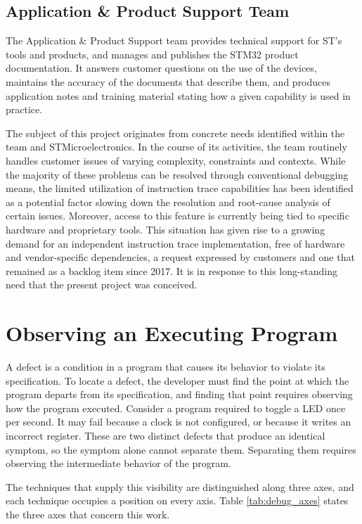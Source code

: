 \subsection{Application \& Product Support Team}

The Application \& Product Support team provides technical support for ST's tools and products, and manages and publishes the STM32 product documentation. It answers customer questions on the use of the devices, maintains the accuracy of the documents that describe them, and produces application notes and training material stating how a given capability is used in practice.

The subject of this project originates from concrete needs identified within the team and STMicroelectronics. In the course of its activities, the team routinely handles customer issues of varying complexity, constraints and contexts. While the majority of these problems can be resolved through conventional debugging means, the limited utilization of instruction trace capabilities has been identified as a potential factor slowing down the resolution and root-cause analysis of certain issues. Moreover, access to this feature is currently being tied to specific hardware and proprietary tools. This situation has given rise to a growing demand for an independent instruction trace implementation, free of hardware and vendor-specific dependencies, a request expressed by customers and one that remained as a backlog item since 2017. It is in response to this long-standing need that the present project was conceived.

\section{Observing an Executing Program}
\label{sec:observability}

A defect is a condition in a program that causes its behavior to violate its specification. To locate a defect, the developer must find the point at which the program departs from its specification, and finding that point requires observing how the program executed. Consider a program required to toggle a LED once per second. It may fail because a clock is not configured, or because it writes an incorrect register. These are two distinct defects that produce an identical symptom, so the symptom alone cannot separate them. Separating them requires observing the intermediate behavior of the program.

The techniques that supply this visibility are distinguished along three axes, and each technique occupies a position on every axis. Table \ref{tab:debug_axes} states the three axes that concern this work.

